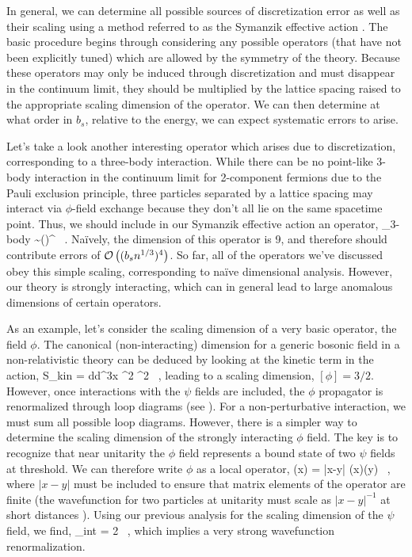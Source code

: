 In general, we can determine all possible sources of discretization error as well as their scaling using a method referred to as the Symanzik effective action \cite{Symanzik1,Symanzik2,Symanzik3,Symanzik4,EKLN4}. The basic procedure begins through considering any possible operators (that have not been explicitly tuned) which are allowed by the symmetry of the theory. Because these operators may only be induced through discretization and must disappear in the continuum limit, they should be multiplied by the lattice spacing raised to the appropriate scaling dimension of the operator. We can then determine at what order in $b_s$, relative to the energy, we can expect systematic errors to arise.

Let's take a look another interesting operator which arises due to discretization, corresponding to a three-body interaction. While there can be no point-like 3-body interaction in the continuum limit for 2-component fermions due to the Pauli exclusion principle, three particles separated by a lattice spacing may interact via $\phi$-field exchange because they don't all lie on the same spacetime point. Thus, we should include in our Symanzik effective action an operator,
\beq
\calO_{\mbox{\tiny 3-body}} \sim \left(\psi \psi \psi \right)^{\dagger} \psi \psi \psi \ .
\eeq
Na\"ively, the dimension of this operator is 9, and therefore should contribute errors of ${\mathcal{ O}}\left((b_sn^{1/3})^4\right)$. So far, all of the operators we've discussed obey this simple scaling, corresponding to na\"ive dimensional analysis. However, our theory is strongly interacting, which can in general lead to large anomalous dimensions of certain operators. 

As an example, let's consider the scaling dimension of a very basic operator, the field $\phi$. The canonical (non-interacting) dimension for a generic bosonic field in a non-relativistic theory can be deduced by looking at the kinetic term in the action,
\beq
S_{\mbox{\tiny kin}} = \int d\tau d^3x \nabla^2 \phi^2 \ ,
\eeq
leading to a scaling dimension, $[\phi] = 3/2$. However, once interactions with the $\psi$ fields are included, the $\phi$ propagator is renormalized through loop diagrams (see ). For a non-perturbative interaction, we must sum all possible loop diagrams. However, there is a simpler way to determine the scaling dimension of the strongly interacting $\phi$ field. The key is to recognize that near unitarity the $\phi$ field represents a bound state of two $\psi$ fields at threshold. We can therefore write $\phi$ as a local operator,
\beq
\phi(x) =  |x-y| \psidag(x)\psi(y) \ ,
\eeq
where $|x-y|$ must be included to ensure that matrix elements of the operator are finite (the wavefunction for two particles at unitarity must scale as $|x-y|^{-1}$ at short distances \cite{NishidaSonConformal}). Using our previous analysis for the scaling dimension of the $\psi$ field, we find,
\beq
[\phi]_{\mbox{\tiny int}} = 2 \ ,
\eeq
which implies a very strong wavefunction renormalization.

